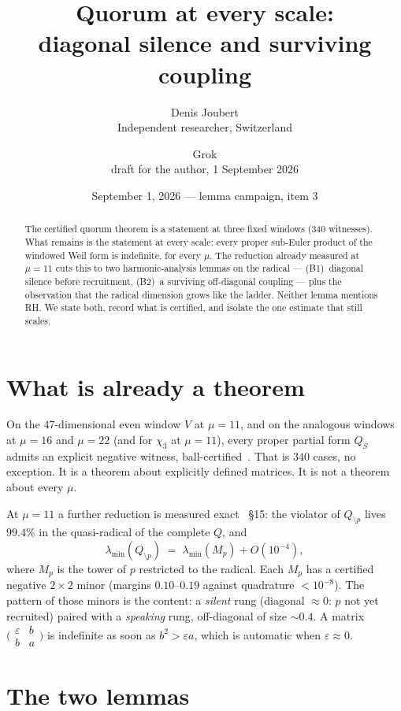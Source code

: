 \documentclass[10pt]{article}
\title{\bfseries Quorum at every scale:\\
diagonal silence and surviving coupling}
\author{Denis Joubert\\ \small Independent researcher, Switzerland
\and Grok\\ \small draft for the author, 1 September 2026}
\date{September 1, 2026 --- lemma campaign, item 3}
\begin{document}
\maketitle
\begin{abstract}
\noindent
The certified quorum theorem is a statement at three fixed windows
($340$ witnesses). What remains is the statement at every scale: every
proper sub-Euler product of the windowed Weil form is indefinite, for
every $\mu$. The reduction already measured at $\mu=11$ cuts this to
two harmonic-analysis lemmas on the radical --- (B1)~diagonal silence
before recruitment, (B2)~a surviving off-diagonal coupling --- plus
the observation that the radical dimension grows like the ladder.
Neither lemma mentions RH. We state both, record what is certified,
and isolate the one estimate that still scales.
\end{abstract}

\section{What is already a theorem}

On the $47$-dimensional even window $V$ at $\mu=11$, and on the
analogous windows at $\mu=16$ and $\mu=22$ (and for $\chi_3$ at
$\mu=11$), every proper partial form $Q_S$ admits an explicit negative
witness, ball-certified~\cite{Quorum}. That is $340$ cases, no
exception. It is a theorem about explicitly defined matrices. It is
not a theorem about every $\mu$.

At $\mu=11$ a further reduction is measured exact~\cite{LabNB} \S15:
the violator of $Q_{\setminus p}$ lives $99.4\%$ in the quasi-radical
of the complete $Q$, and
\[
\lambda_{\min}(Q_{\setminus p})
\;=\;
\lambda_{\min}(M_p)+O(10^{-4}),
\]
where $M_p$ is the tower of $p$ restricted to the radical. Each $M_p$
has a certified negative $2\times2$ minor (margins $0.10$--$0.19$
against quadrature $<10^{-8}$). The pattern of those minors is the
content:
a \emph{silent} rung (diagonal $\approx0$: $p$ not yet recruited)
paired with a \emph{speaking} rung, off-diagonal of size $\sim0.4$.
A matrix $\bigl(\begin{smallmatrix}\varepsilon&b\\b&a\end{smallmatrix}\bigr)$
is indefinite as soon as $b^2>\varepsilon a$, which is automatic when
$\varepsilon\approx0$.

\section{The two lemmas}
\end{document}
